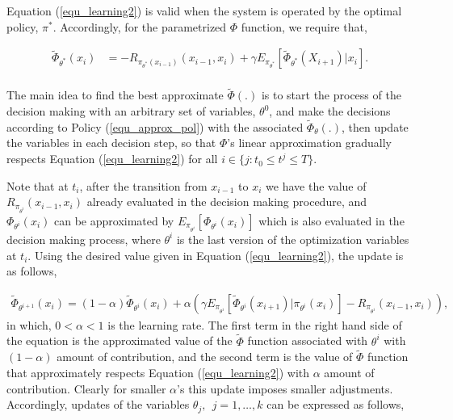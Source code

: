 \documentclass[12pt]{aastex62}
\theoremstyle{definition}
\begin{document}
Equation (\ref{equ_learning2}) is valid when the system is operated by the optimal policy, $\pi^*$. Accordingly, for the parametrized $\Phi$ function, we require that,


\begin{equation} \label{equ_learning2}
\begin{aligned}
\tilde \Phi_{\theta^*}(x_{i}) &=  - R_{\pi_{\theta^*}(x_{i-1})}(x_{i-1},x_i)  + \gamma E_{\pi_{\theta^*}}[\tilde \Phi_{\theta^*}(X_{{i+1}})|x_i].\\
\end{aligned}
\end{equation}

The main idea to find the best approximate $\tilde {\Phi}(.)$ is to start the process of the decision making with an arbitrary set of variables, $\theta^0$, and make the decisions according to Policy (\ref{equ_approx_pol}) with the associated $\tilde \Phi_{\theta}(.)$, then update the variables in each decision step, so that $\Phi$'s linear approximation gradually respects Equation (\ref{equ_learning2}) for all $i \in \{j: t_0 \leq t^j \leq T\}$.

Note that at $t_i$, after the transition from $x_{{i-1}}$ to $x_{{i}}$ we have the value of $R_{\pi_{\theta^i}}(x_{i-1},x_i) $ already evaluated in the decision making procedure, and  $\Phi_{\theta^i}(x_{i})$ can be approximated by $E_{\pi_{\theta^i}}[ \Phi_{\theta^i}(x_{i})]$ which is also evaluated in the decision making process, where $\theta^i$ is the last version of the optimization variables at $t_i$. Using the desired value given in Equation (\ref{equ_learning2}), the update is as follows,

\begin{equation}\label{equ_updatePHI}
\begin{aligned}
\tilde \Phi_{\theta^{i+1}}(x_{{i}}) = (1-\alpha) \tilde \Phi_{\theta^{i}}(x_{{i}})+ \alpha  ( \gamma  E_{\pi_{\theta^i}}[\tilde \Phi_{\theta^{i}}(x_{{i+1}})|\pi_{\theta^{i}}(x_{{i}})] -R_{\pi_{\theta^i}}(x_{i-1},x_i) ),
\end{aligned}
\end{equation}
in which, $0<\alpha<1$ is the learning rate. The first term in the right hand side of the equation is the approximated value of the $\tilde \Phi$ function associated with $\theta^i$ with $(1-\alpha)$ amount of contribution, and the second term is the value of $\tilde \Phi$ function that approximately respects Equation (\ref{equ_learning2}) with $\alpha$ amount of contribution. Clearly for smaller $\alpha$'s this update imposes smaller adjustments. Accordingly, updates of the variables $\theta_j,~~j=1,\dots, k$ can be expressed as follows,
\end{document}
